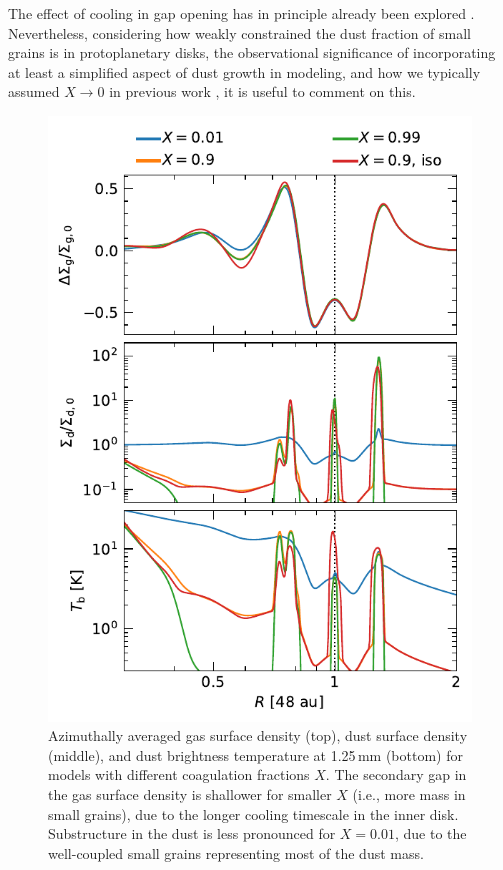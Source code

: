 \documentclass[fleqn,usenatbib,useAMS]{mnras}
\begin{document}
The effect of cooling in gap opening has in principle already been explored \citep{miranda-rafikov-2020a,miranda-rafikov-2020b,zhang-zhu-2020,ziampras-etal-2020b,ziampras-etal-2023a}. Nevertheless, considering how weakly constrained the dust fraction of small grains is in protoplanetary disks, the observational significance of incorporating at least a simplified aspect of dust growth in modeling, and how we typically assumed $X\rightarrow0$ in previous work \citep[i.e., a dust-to-gas ratio of 0.01 in small grains, e.g.,][]{ziampras-etal-2020b,ziampras-etal-2023a}, it is useful to comment on this.

\begin{figure}
	\centering
	\includegraphics[width=\columnwidth]{compare-X-1D.pdf}
	\caption{Azimuthally averaged gas surface density (top), dust surface density (middle), and dust brightness temperature at 1.25\,mm (bottom) for models with different coagulation fractions $X$. The secondary gap in the gas surface density is shallower for smaller $X$ (i.e., more mass in small grains), due to the longer cooling timescale in the inner disk. Substructure in the dust is less pronounced for $X=0.01$, due to the well-coupled small grains representing most of the dust mass.}
	\label{fig:compare-X-1D}
\end{figure}
\end{document}
